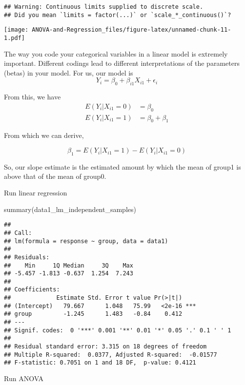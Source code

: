 \documentclass[
]{book}
\newenvironment{Shaded}{\begin{snugshade}}{\end{snugshade}}
\newcommand{\AttributeTok}[1]{\textcolor[rgb]{0.77,0.63,0.00}{#1}}
\newcommand{\FunctionTok}[1]{\textcolor[rgb]{0.00,0.00,0.00}{#1}}
\newcommand{\NormalTok}[1]{#1}
\newcommand{\OtherTok}[1]{\textcolor[rgb]{0.56,0.35,0.01}{#1}}
\newcommand{\SpecialCharTok}[1]{\textcolor[rgb]{0.00,0.00,0.00}{#1}}
\begin{document}
\begin{verbatim}
## Warning: Continuous limits supplied to discrete scale.
## Did you mean `limits = factor(...)` or `scale_*_continuous()`?
\end{verbatim}

\texttt{[image: ANOVA-and-Regression\_files/figure-latex/unnamed-chunk-11-1.pdf]}

The way you code your categorical variables in a linear model is
extremely important. Different codings lead to different interpretations
of the parameters (betas) in your model. For us, our model is
\[
Y_i = \beta_0+\beta_{i1}X_{i1}+\epsilon_i
\]

From this, we have
\[
\begin{aligned}
E(Y_i|X_{i1}=0) &=\beta_0 \\
E(Y_i|X_{i1}=1) &=\beta_0 + \beta_1
\end{aligned}
\]

From which we can derive,

\[
\beta_1 = E(Y_i|X_{i1}=1) - E(Y_i|X_{i1}=0)
\]

So, our slope estimate is the estimated amount by which the mean of
group1 is above that of the mean of group0.

Run linear regression

\begin{Shaded}
\begin{Highlighting}[]
\FunctionTok{summary}\NormalTok{(data1\_lm\_independent\_samples)}
\end{Highlighting}
\end{Shaded}

\begin{verbatim}
## 
## Call:
## lm(formula = response ~ group, data = data1)
## 
## Residuals:
##    Min     1Q Median     3Q    Max 
## -5.457 -1.813 -0.637  1.254  7.243 
## 
## Coefficients:
##             Estimate Std. Error t value Pr(>|t|)    
## (Intercept)   79.667      1.048   75.99   <2e-16 ***
## group         -1.245      1.483   -0.84    0.412    
## ---
## Signif. codes:  0 '***' 0.001 '**' 0.01 '*' 0.05 '.' 0.1 ' ' 1
## 
## Residual standard error: 3.315 on 18 degrees of freedom
## Multiple R-squared:  0.0377, Adjusted R-squared:  -0.01577 
## F-statistic: 0.7051 on 1 and 18 DF,  p-value: 0.4121
\end{verbatim}

Run ANOVA

\begin{Shaded}
\end{Shaded}
\end{document}
